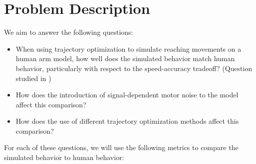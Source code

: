 \documentclass[table,12pt]{article}
\begin{document}
\section{Problem Description}
We aim to answer the following questions: 
\begin{itemize}
    \item When using trajectory optimization to simulate reaching movements on a human arm model, how well does the simulated behavior match human behavior, particularly with respect to the speed-accuracy tradeoff? (Question studied in \cite{c5})

    \item How does the introduction of signal-dependent motor noise to the model affect this comparison?

    \item How does the use of different trajectory optimization methods affect this comparison?
\end{itemize}
For each of these questions, we will use the following metrics to compare the simulated behavior to human behavior:
\end{document}
